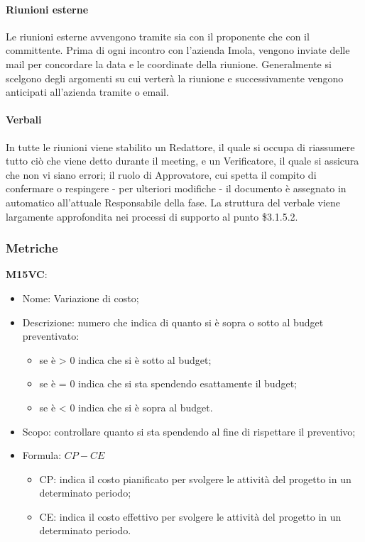 \paragraph{Riunioni esterne} \hfill \break
Le riunioni esterne avvengono tramite  sia con il proponente che con il committente. Prima di ogni incontro con 
l'azienda Imola, vengono inviate delle mail per concordare la data e le coordinate della riunione. Generalmente si scelgono
degli argomenti su cui verterà la riunione e successivamente vengono anticipati all'azienda tramite  o email.

\paragraph{Verbali} \hfill \break
In tutte le riunioni viene stabilito un Redattore, il quale si occupa di riassumere tutto ciò che
viene detto durante il meeting, e un Verificatore, il quale si assicura che non vi siano errori; 
il ruolo di Approvatore, cui spetta il compito di confermare o respingere - per ulteriori modifiche - il 
documento è assegnato in automatico all'attuale Responsabile della fase. La struttura del verbale viene 
largamente approfondita nei processi di supporto al punto \$3.1.5.2.

\subsubsection{Metriche}
\textbf{M15VC}:
\begin{itemize}
    \item Nome: Variazione di costo;
    \item Descrizione: numero che indica di quanto si è sopra o sotto al budget preventivato:
         \begin{itemize}
            \item se è > 0 indica che si è sotto al budget;
            \item se è = 0 indica che si sta spendendo esattamente il budget;
            \item se è < 0 indica che si è sopra al budget.
        \end{itemize}
    \item Scopo: controllare quanto si sta spendendo al fine di rispettare il preventivo;
    \item Formula: $ CP - CE $
        \begin{itemize}
            \item CP: indica il costo pianificato per svolgere le attività del progetto in un determinato 
            periodo;
            \item CE: indica il costo effettivo per svolgere le attività del progetto in un determinato 
            periodo.
        \end{itemize}
\end{itemize}

